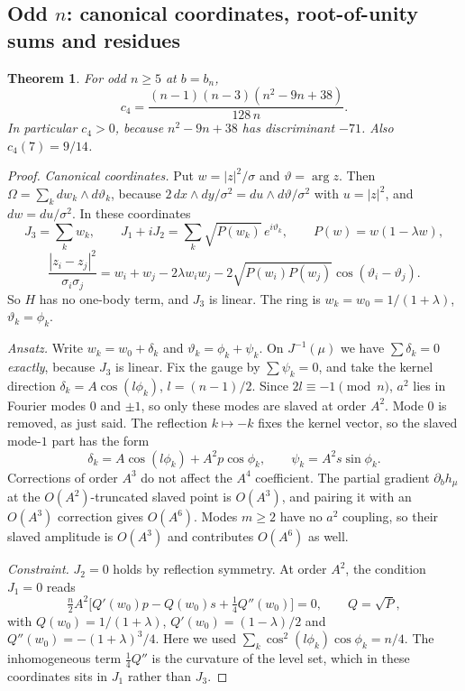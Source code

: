 \documentclass[11pt]{article}
\newtheorem{theorem}{Theorem}
\theoremstyle{definition}
\theoremstyle{remark}
\begin{document}
\subsection{Odd $n$: canonical coordinates, root-of-unity sums and residues}

\begin{theorem}\label{thm:odd}
For odd $n\ge5$ at $b=b_n$,
\[
c_4=\frac{(n-1)(n-3)(n^2-9n+38)}{128\,n}.
\]
In particular $c_4>0$, because $n^2-9n+38$ has discriminant $-71$. Also $c_4(7)=9/14$.
\end{theorem}

\begin{proof}
\emph{Canonical coordinates.} Put $w=|z|^2/\sigma$ and $\vartheta=\arg z$. Then
$\Omega=\sum_kdw_k\wedge d\vartheta_k$, because $2\,dx\wedge dy/\sigma^2=du\wedge d\vartheta/\sigma^2$ with
$u=|z|^2$, and $dw=du/\sigma^2$. In these coordinates
\[
J_3=\sum_kw_k,\qquad J_1+iJ_2=\sum_k\sqrt{P(w_k)}\,e^{i\vartheta_k},\qquad P(w)=w(1-\lambda w),
\]
\[
\frac{|z_i-z_j|^2}{\sigma_i\sigma_j}=w_i+w_j-2\lambda w_iw_j-2\sqrt{P(w_i)P(w_j)}\cos(\vartheta_i-\vartheta_j).
\]
So $H$ has no one-body term, and $J_3$ is linear. The ring is $w_k=w_0=1/(1+\lambda)$,
$\vartheta_k=\phi_k$.

\emph{Ansatz.} Write $w_k=w_0+\delta_k$ and $\vartheta_k=\phi_k+\psi_k$. On $J^{-1}(\mu)$ we have
$\sum\delta_k=0$ \emph{exactly}, because $J_3$ is linear. Fix the gauge by $\sum\psi_k=0$, and take the
kernel direction $\delta_k=A\cos(l\phi_k)$, $l=(n-1)/2$. Since $2l\equiv-1\pmod n$, $a^2$ lies in Fourier
modes $0$ and $\pm1$, so only these modes are slaved at order $A^2$. Mode $0$ is removed, as just said. The
reflection $k\mapsto-k$ fixes the kernel vector, so the slaved mode-$1$ part has the form
\[
\delta_k=A\cos(l\phi_k)+A^2p\cos\phi_k,\qquad \psi_k=A^2s\sin\phi_k .
\]
Corrections of order $A^3$ do not affect the $A^4$ coefficient. The partial gradient $\partial_bh_\mu$ at
the $O(A^2)$-truncated slaved point is $O(A^3)$, and pairing it with an $O(A^3)$ correction gives
$O(A^6)$. Modes $m\ge2$ have no $a^2$ coupling, so their slaved amplitude is $O(A^3)$ and contributes
$O(A^6)$ as well.

\emph{Constraint.} $J_2=0$ holds by reflection symmetry. At order $A^2$, the condition $J_1=0$ reads
\[
\tfrac n2A^2\big[Q'(w_0)p-Q(w_0)s+\tfrac14Q''(w_0)\big]=0,\qquad Q=\sqrt P,
\]
with $Q(w_0)=1/(1+\lambda)$, $Q'(w_0)=(1-\lambda)/2$ and $Q''(w_0)=-(1+\lambda)^3/4$. Here we used
$\sum_k\cos^2(l\phi_k)\cos\phi_k=n/4$. The inhomogeneous term $\tfrac14Q''$ is the curvature of the level
set, which in these coordinates sits in $J_1$ rather than $J_3$.


\end{proof}
\end{document}
